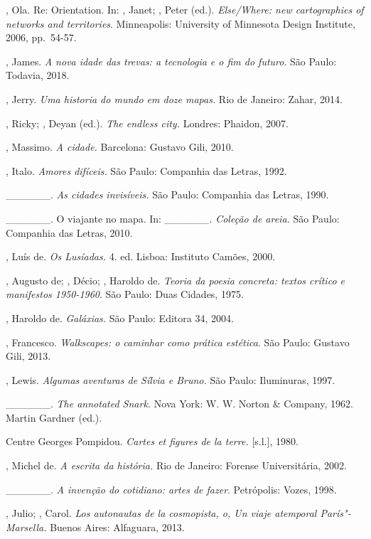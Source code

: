 \begin{Parskip}
, Ola. Re: Orientation. In: , Janet; , Peter (ed.). \emph{Else/Where: new cartographies of networks and territories}.
Minneapolis: University of Minnesota Design Institute, 2006, pp.~54-57.

, James. \emph{A nova idade das trevas: a tecnologia e o fim do futuro}. São Paulo: Todavia, 2018.

, Jerry. \emph{Uma historia do mundo em doze mapas.} Rio de
Janeiro: Zahar, 2014.

, Ricky; , Deyan (ed.). \emph{The endless city.} Londres:
Phaidon, 2007.

, Massimo. \emph{A cidade.} Barcelona: Gustavo Gili, 2010.

, Italo. \emph{Amores difíceis.} São Paulo: Companhia das
Letras, 1992.

\_\_\_\_\_\_. \emph{As cidades invisíveis.} São Paulo: Companhia
das Letras, 1990.

\_\_\_\_\_\_. O viajante no mapa. In: \_\_\_\_\_\_.
\emph{Coleção de areia.} São Paulo: Companhia das Letras, 2010.

, Luís de. \emph{Os Lusíadas.} 4. ed. Lisboa: Instituto Camões,
2000.

, Augusto de; , Décio; , Haroldo de. \emph{Teoria da poesia concreta: textos crítico e manifestos 1950-1960}. São Paulo:
Duas Cidades, 1975.

, Haroldo de. \emph{Galáxias.} São Paulo: Editora 34, 2004.

, Francesco. \emph{Walkscapes: o caminhar como prática
estética}. São Paulo: Gustavo Gili, 2013.

, Lewis. \emph{Algumas aventuras de Sílvia e Bruno.} São Paulo:
Iluminuras, 1997.

\_\_\_\_\_\_. \emph{The annotated Snark.} Nova York: W. W. Norton
\& Company, 1962. Martin Gardner (ed.).

Centre Georges Pompidou. \emph{Cartes et figures de la terre.}
{[}s.l.{]}, 1980.

, Michel de. \emph{A escrita da história.} Rio de Janeiro: Forense Universitária, 2002.

\_\_\_\_\_\_. \emph{A invenção do cotidiano: artes de fazer}.
Petrópolis: Vozes, 1998.

, Julio; , Carol. \emph{Los autonautas de la cosmopista,
o, Un viaje atemporal París"-Marsella.} Buenos Aires: Alfaguara, 2013.


\end{Parskip}
